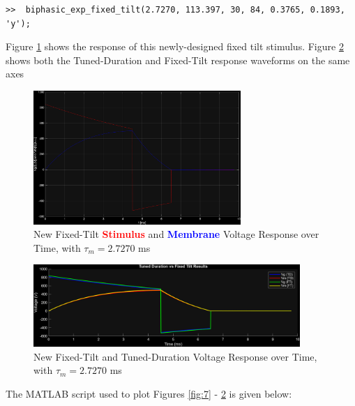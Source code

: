 \documentclass[]{report}
\begin{document}
\begin{lstlisting}[style=Matlab-editor, backgroundcolor=\color{smoky}]
>>  biphasic_exp_fixed_tilt(2.7270, 113.397, 30, 84, 0.3765, 0.1893, 'y');
\end{lstlisting}

Figure \ref{fig:8} shows the response of this newly-designed fixed tilt stimulus. Figure \ref{fig:9} shows both the Tuned-Duration and Fixed-Tilt response waveforms on the same axes

\begin{figure}[H]
	\centering
	\includegraphics[width=0.7\textwidth]{q4_response2.png}
	\caption{\centering New Fixed-Tilt \textcolor{red}{\textbf{Stimulus}} and \textcolor{blue}{\textbf{Membrane}} Voltage Response over Time, with $\tau_m = 2.7270$ ms}
	\label{fig:8}
\end{figure}

\begin{figure}[H]
	\centering
	\includegraphics[width=0.9\textwidth]{td_vs_ft.png}
	\caption{\centering New Fixed-Tilt and Tuned-Duration Voltage Response over Time, with $\tau_m = 2.7270$ ms}
	\label{fig:9}
\end{figure}

The MATLAB script used to plot Figures \ref{fig:7} - \ref{fig:9} is given below:
\end{document}
